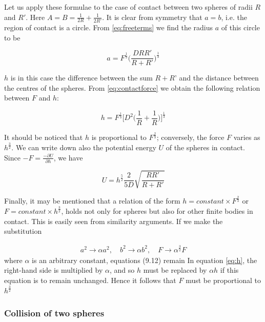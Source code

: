 Let us apply these formulae to the case of contact between two spheres of
radii $R$ and $R'$. Here $A = B = \frac{1}{2R} + \frac{1}{2R'}$. It is clear from symmetry that $a = b$, i.e. the region of contact is a circle. From \ref{eq:freeterms} we find the radius $a$ of this circle to be

\begin{equation}
a = F^{\frac{1}{3}} \Big(\frac{DRR'}{R+R'} \Big)^{\frac{1}{3}}
\end{equation}

$h$ is in this case the difference between the sum $R+R’$ and the distance between the centres of the spheres. From \ref{eq:contactforce} we obtain the following relation between $F$ and $h$:

\begin{equation}
h = F^{\frac{1}{3}} \Big[ D^{2} \Big( \frac{1}{R} + \frac{1}{R} \Big) \Big]^{\frac{1}{3}}
\end{equation}

It should be noticed that $h$ is proportional to $F^{\frac{2}{3}}$; conversely, the force $F$ varies as $h^{\frac{3}{2}}$. We can write down also the potential energy $U$ of the spheres
in contact. Since $ -F = \frac{-\partial U}{\partial h}$, we have

\begin{equation}
U = h^{\frac{5}{2}} \frac{2}{5D} \sqrt{\frac{RR'}{R+R'}}
\label{eq:potential}
\end{equation}

Finally, it may be mentioned that a relation of the form $h = constant \times F^{\frac{2}{3}}$ or $F = constant \times h^{\frac{3}{2}}$, holds not only for spheres but also for other finite bodies in contact. This is easily seen from similarity arguments. If we make
the substitution

\begin{align*}
a^{2} \rightarrow \alpha a^{2}, \quad b^{2} \rightarrow \alpha b^{2}, \quad F \rightarrow \alpha^{\frac{3}{2}}F
\end{align*}
where $\alpha$ is an arbitrary constant, equations (9.12) remain  In
equation \ref{eq:h}, the right-hand side is multiplied by $\alpha$, and so $h$ must be replaced by $\alpha h$ if this equation is to remain unchanged. Hence it follows that $F$ must be proportional to $h^{\frac{3}{2}}$



\subsubsection{Collision of two spheres}


